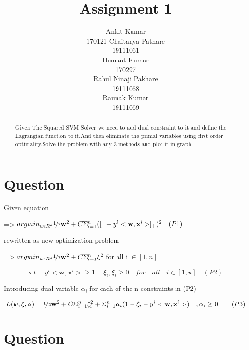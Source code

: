 \documentclass{article}
\title{Assignment 1}
\author{%
Ankit Kumar \\
170121 \AND
   Chaitanya Pathare \\ 19111061\\ \AND
   Hemant Kumar \\ 170297\\ \AND
Rahul Ninaji Pakhare \\ 19111068 \\ \AND 
Raunak Kumar \\ 19111069\\
}
\begin{document}
\maketitle

\begin{abstract}
  Given The Squared SVM Solver we need to add dual constraint to it and define the Lagrangian function to it.And then eliminate the primal variables using first order optimality.Solve the problem with any 3 methods and plot it in graph
\end{abstract}

\section{Question}

Given equation 

=> $ argmin _{ w \epsilon R^d } \nicefrac{1}{2} \textbf{w} ^2  + C \Sigma _{i=1} ^n  ([ 1 - y^i < \textbf{w} ,  \textbf{x} ^i > ]_+)^2  \quad (P1) $

rewritten as new optimization problem

=> $ argmin _{ w \epsilon R^d } \nicefrac{1}{2}  \textbf{w} ^2 + C \Sigma _{i=1} ^n \xi  ^2  $ for all i $ \in [1,n] $

\[ s.t. \quad y^i <\textbf{w} ,  \textbf{x} ^i>  \geq 1 - \xi _i , \xi _i \geq 0 \quad for \quad all \quad i \in [1,n] \quad (P2)  \]

Introducing dual variable $ \alpha _i $ for each of the n constraints in (P2)

\[  L(w, \xi , \alpha ) =  \nicefrac{1}{2} \textbf{w}  ^2 + C \Sigma _{i=1} ^n \xi _i^2 + \Sigma _{i=1} ^n \alpha _i ( 1 - \xi _i -y^i< \textbf{w} ,  \textbf{x} ^i>) \quad, \alpha _i \geq 0  \qquad (P3) \]



\section{Question}
\end{document}

